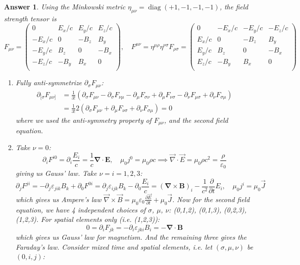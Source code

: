 \documentclass[a4paper]{article}
\DeclareMathOperator{\diag}{diag}
\theoremstyle{new2}
\newtheorem{ans}{Answer}[section]
\theoremstyle{new}
\begin{document}
\begin{ans}
Using the Minkowski metric $\eta_{\mu\nu}=\diag(+1,-1,-1,-1)$, the field strength tensor is
$$F_{\mu\nu}=\begin{pmatrix}0&E_x/c&E_y/c&E_z/c\\-E_x/c&0&-B_z&B_y\\-E_y/c&B_z&0&-B_x\\-E_z/c&-B_y&B_x&0\\\end{pmatrix},\quad F^{\mu\nu}=\eta^{\mu\rho}\eta^{\nu\sigma}F_{\rho\sigma}=\begin{pmatrix}0&-E_x/c&-E_y/c&-E_z/c\\E_x/c&0&-B_z&B_y\\E_y/c&B_z&0&-B_x\\E_z/c&-B_y&B_x&0\\\end{pmatrix}$$
\begin{enumerate}[label=(\alph*)]
\item Fully anti-symmetrize $\partial_\sigma F_{\mu\nu}$:
\begin{align}
    \partial_{[\sigma}F_{\mu\nu]}&=\frac{1}{3!}(\partial_\sigma F_{\mu\nu}-\partial_\sigma F_{\nu\mu}-\partial_\mu F_{\sigma\nu}+\partial_\mu F_{\nu\sigma}-\partial_\nu F_{\mu\sigma}+\partial_\nu F_{\sigma\mu})\nonumber\\&=\frac{1}{3!}2(\partial_\sigma F_{\mu\nu}+\partial_\mu F_{\nu\sigma}+\partial_\nu F_{\sigma\mu})=0\nonumber
\end{align}
where we used the anti-symmetry property of $F_{\mu\nu}$, and the second field equation.
\item Take $\nu=0$:
$$\partial_iF^{i0}=\partial_i\frac{E_i}{c}=\frac{1}{c}\boldsymbol{\nabla}\cdot\mathbf{E},\quad\mu_0j^0=\mu_0\rho c\implies\vec{\nabla}\cdot\vec{E}=\mu_0\rho c^2=\frac{\rho}{\varepsilon_0}$$
giving us Gauss' law.
Take $\nu=i=1,2,3$:
$$\partial_jF^{ji}=-\partial_j\varepsilon_{jik}B_k+\partial_0F^{0i}=\partial_j\varepsilon_{ijk}B_k-\partial_0\frac{E_i}{c}=(\boldsymbol{\nabla}\times\mathbf{B})_i-\frac{1}{c^2}\frac{\partial}{\partial t}E_i,\quad\mu_0j^i=\mu_0\vec{J}$$
which gives us Ampere's law $\vec{\nabla}\times\vec{B}=\mu_0\varepsilon_0\frac{\partial\vec{E}}{\partial t}+\mu_0\vec{J}$. Now for the second field equation, we have 4 independent choices of $\sigma$, $\mu$, $\nu$: (0,1,2), (0,1,3), (0,2,3), (1,2,3). For spatial elements only (i.e. (1,2,3)):
$$0=\partial_iF_{jk}=-\partial_i\varepsilon_{jki}B_i=-\boldsymbol{\nabla}\cdot\mathbf{B}$$
which gives us Gauss' law for magnetism. And the remaining three gives the Faraday's law. Consider mixed time and spatial elements, i.e. let $(\sigma,\mu,\nu)$ be $(0,i,j)$:

\end{enumerate}
\end{ans}
\end{document}

